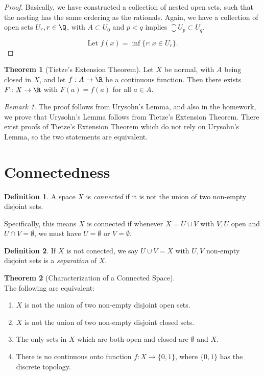 \documentclass[a5paper]{article}
\theoremstyle{definition}%
\newtheorem{theorem}{Theorem}
\newtheorem*{definition*}{Definition}
\numberwithin{exercise}{section}
\theoremstyle{remark}%
\newtheorem*{remark*}{Remark}
\begin{document}
\begin{proof}
Basically, we have constructed a collection of nested open sets, such that the nesting has the same ordering as the rationals. Again, we have a collection of open sets $U_r, r\in \Q$, with $A\subset U_0$ and $p<q$ implies $\closure{U_p} \subset U_q$. 

$$\text{Let } f(x)=\inf\{r:x\in U_r\}.$$
\end{proof}

\begin{highlight}
\begin{theorem}[Tietze's Extension Theorem] Let $X$ be normal, with $A$ being closed in $X$, and let $f:A\to \R$ be a continuous function. Then there exists $F:X\to \R$ with $F(a)=f(a)$ for all $a\in A$. 
\end{theorem}
\end{highlight}

\begin{remark*}
The proof follows from Urysohn's Lemma, and also in the homework, we prove that Urysohn's Lemma follows from Tietze's Extension Theorem. There exist proofs of Tietze's Extension Theorem which do not rely on Urysohn's Lemma, so the two statements are equivalent. 
\end{remark*}

\section{Connectedness}

\begin{highlight}
\begin{definition*}
A space $X$ is \emph{connected} if it is not the union of two non-empty disjoint sets. 
\end{definition*}
\end{highlight}
Specifically, this means $X$ is connected if whenever $X=U\cup V$ with $V,U$ open and $U\cap V=\emptyset$, we must have $U=\emptyset$ or $V=\emptyset$. 

\begin{definition*}
If $X$ is not conected, we say $U\cup V=X$ with $U,V$ non-empty disjoint sets is a \emph{separation} of $X$. 
\end{definition*}

\begin{highlight}
\begin{theorem}[Characterization of a Connected Space]\mbox{}\\
The following are equivalent:
\begin{enumerate}[label=(\roman*)]
\item $X$ is not the union of two non-empty disjoint open sets. 
\item $X$ is not the union of two non-empty disjoint closed sets. 
\item The only sets in $X$ which are both open and closed are $\emptyset$ and $X$. 
\item There is no continuous onto function $f:X\to \{0,1\}$, where $\{0,1\}$ has the discrete topology. 
\end{enumerate}
\end{theorem}
\end{highlight}
\end{document}
